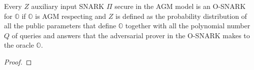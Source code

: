 \begin{theorem}
\label{the:when_osnarks} 
Every $Z$ auxiliary input SNARK $\Pi$ secure in the AGM model is an 
O-SNARK for $\mathbb{O}$ if $\mathbb{O}$ is AGM respecting and 
$Z$ is defined as the probability distribution of all the public parameters that define 
$\mathbb{O}$ together with all the polynomial number $Q$ of queries and answers that 
the adversarial prover in the O-SNARK makes to the oracle $\mathbb{O}$.
\end{theorem}

\begin{proof}
\end{proof}


